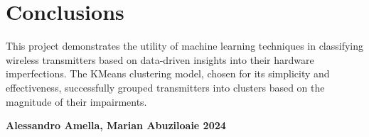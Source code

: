 \documentclass{article}
\begin{document}
\section{Conclusions}
This project demonstrates the utility of machine learning techniques in classifying wireless transmitters based on data-driven insights into their hardware imperfections. The KMeans clustering model, chosen for its simplicity and effectiveness, successfully grouped transmitters into clusters based on the magnitude of their impairments.


\appendix

\vspace*{\fill}

\hrulefill
\vspace{1em}

\textbf{Alessandro Amella, Marian Abuziloaie \textcopyright{} 2024}
\end{document}
